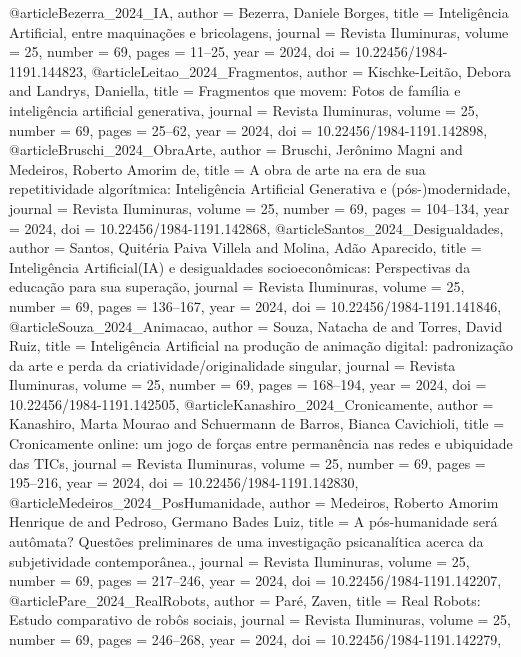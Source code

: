 @article{Bezerra_2024_IA,
  author  = {Bezerra, Daniele Borges},
  title   = {Inteligência Artificial, entre maquinações e bricolagens},
  journal = {Revista Iluminuras},
  volume  = {25},
  number  = {69},
  pages   = {11--25},
  year    = {2024},
  doi     = {10.22456/1984-1191.144823},
}
@article{Leitao_2024_Fragmentos,
  author  = {Kischke-Leitão, Debora and Landrys, Daniella},
  title   = {Fragmentos que movem: Fotos de família e inteligência artificial generativa},
  journal = {Revista Iluminuras},
  volume  = {25},
  number  = {69},
  pages   = {25--62},
  year    = {2024},
  doi     = {10.22456/1984-1191.142898},
}
@article{Bruschi_2024_ObraArte,
  author  = {Bruschi, Jerônimo Magni and Medeiros, Roberto Amorim de},
  title   = {A obra de arte na era de sua repetitividade algorítmica: Inteligência Artificial Generativa e (pós-)modernidade},
  journal = {Revista Iluminuras},
  volume  = {25},
  number  = {69},
  pages   = {104--134},
  year    = {2024},
  doi     = {10.22456/1984-1191.142868},
}
@article{Santos_2024_Desigualdades,
  author  = {Santos, Quitéria Paiva Villela and Molina, Adão Aparecido},
  title   = {Inteligência Artificial(IA) e desigualdades socioeconômicas: Perspectivas da educação para sua superação},
  journal = {Revista Iluminuras},
  volume  = {25},
  number  = {69},
  pages   = {136--167},
  year    = {2024},
  doi     = {10.22456/1984-1191.141846},
}
@article{Souza_2024_Animacao,
  author  = {Souza, Natacha de and Torres, David Ruiz},
  title   = {Inteligência Artificial na produção de animação digital: padronização da arte e perda da criatividade/originalidade singular},
  journal = {Revista Iluminuras},
  volume  = {25},
  number  = {69},
  pages   = {168--194},
  year    = {2024},
  doi     = {10.22456/1984-1191.142505},
}
@article{Kanashiro_2024_Cronicamente,
  author  = {Kanashiro, Marta Mourao and Schuermann de Barros, Bianca Cavichioli},
  title   = {Cronicamente online: um jogo de forças entre permanência nas redes e ubiquidade das TICs},
  journal = {Revista Iluminuras},
  volume  = {25},
  number  = {69},
  pages   = {195--216},
  year    = {2024},
  doi     = {10.22456/1984-1191.142830},
}
@article{Medeiros_2024_PosHumanidade,
  author  = {Medeiros, Roberto Amorim Henrique de and Pedroso, Germano Bades Luiz},
  title   = {A pós-humanidade será autômata? Questões preliminares de uma investigação psicanalítica acerca da subjetividade contemporânea.},
  journal = {Revista Iluminuras},
  volume  = {25},
  number  = {69},
  pages   = {217--246},
  year    = {2024},
  doi     = {10.22456/1984-1191.142207},
}
@article{Pare_2024_RealRobots,
  author  = {Paré, Zaven},
  title   = {Real Robots: Estudo comparativo de robôs sociais},
  journal = {Revista Iluminuras},
  volume  = {25},
  number  = {69},
  pages   = {246--268},
  year    = {2024},
  doi     = {10.22456/1984-1191.142279},
}
